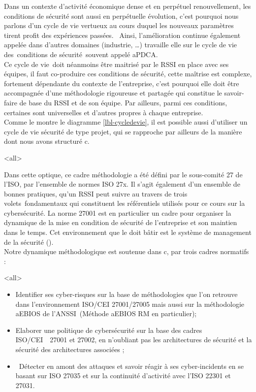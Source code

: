 Dans un contexte d'activité économique dense et en perpétuel renouvellement, les conditions de sécurité sont aussi en perpétuelle évolution, c’est pourquoi nous parlons d'un cycle de vie vertueux au cours duquel les nouveaux paramètres tirent profit des expériences passées.  Ainsi, l’amélioration continue également appelée  dans d’autres domaines (industrie, …) travaille elle sur le cycle de vie des conditions de sécurité souvent appelé \gls{aPDCA}.\\
Ce cycle de vie doit néanmoins être maitrisé par le RSSI en place avec ses équipes, il faut co-produire ces conditions de sécurité, cette maîtrise est complexe, fortement dépendante du contexte de l'entreprise, c’est pourquoi elle doit être accompagnée d'une méthodologie rigoureuse et partagée qui constitue le savoir-faire de base du RSSI et de son équipe. Par ailleurs, parmi ces conditions, certaines sont universelles et d’autres propres à chaque entreprise. \\ Comme le montre le diagramme \ref{lbl-cycledevie}, il est possible aussi d’utiliser un cycle de vie sécurité de type projet, qui se rapproche par ailleurs de la manière dont nous avons structuré c\edoc. 

\mode<all>{}


Dans cette optique, ce cadre méthodologie a été défini par le sous-comité 27 de l'ISO, par l'ensemble de normes ISO 27x. Il s’agit également d'un ensemble de bonnes pratiques, qu'un RSSI peut suivre au travers de trois volets fondamentaux qui constituent les référentiels utilisés pour ce cours sur la cybersécurité. La norme 27001 est en particulier un cadre pour organiser la dynamique de la mise en condition de sécurité de l’entreprise et son maintien dans le temps. Cet environnement que le  doit bâtir est le système de management de la sécurité ().\\
Notre dynamique méthodologique est soutenue dans  c\edoc, par trois cadres normatifs : 
 
\mode<all>{
{
\begin{itemize}
\item Identifier ses cyber-risques sur la base de méthodologies que l’on retrouve dans l’environnement ISO/CEI 27001/27005 mais aussi sur la méthodologie \gls{aEBIOS} de l’ANSSI (Méthode \gls{aEBIOS} RM en particulier); 
\item Elaborer une politique de cybersécurité sur la base des cadres ISO/CEI  27001 et 27002, en n’oubliant pas les architectures de sécurité et la sécurité des architectures associées ; 
\item Détecter en amont des attaques et savoir réagir à ses cyber-incidents en se basant sur ISO 27035 et sur la continuité d’activité avec l’ISO 22301 et 27031.
\end{itemize}
}} %


